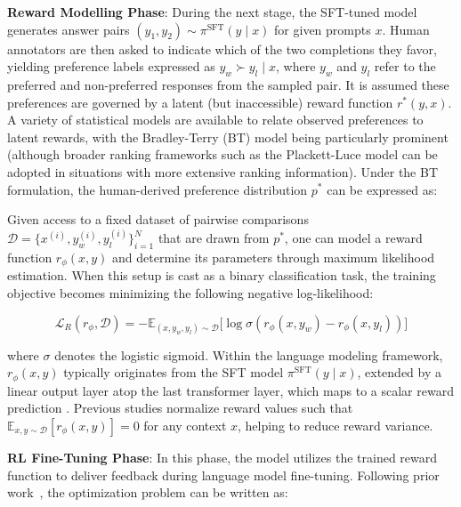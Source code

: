\textbf{Reward Modelling Phase}: During the next stage, the SFT-tuned model generates answer pairs $(y_1, y_2)\sim \pi^\text{SFT}(y \mid x)$ for given prompts $x$. Human annotators are then asked to indicate which of the two completions they favor, yielding preference labels expressed as $y_w\succ y_l \mid x$, where $y_w$ and $y_l$ refer to the preferred and non-preferred responses from the sampled pair. It is assumed these preferences are governed by a latent (but inaccessible) reward function $r^*(y, x)$. A variety of statistical models are available to relate observed preferences to latent rewards, with the Bradley-Terry (BT) model \cite{bradley1952rankanalysis} being particularly prominent (although broader ranking frameworks such as the Plackett-Luce model \citep{plackett1975analysis, luce2012individual} can be adopted in situations with more extensive ranking information). Under the BT formulation, the human-derived preference distribution $p^*$ can be expressed as:

Given access to a fixed dataset of pairwise comparisons $\mathcal{D} = \bigl\{x^{(i)}, y_w^{(i)}, y_l^{(i)}\bigr\}_{i=1}^N$ that are drawn from $p^*$, one can model a reward function $r_{\phi}(x, y)$ and determine its parameters through maximum likelihood estimation. When this setup is cast as a binary classification task, the training objective becomes minimizing the following negative log-likelihood:

\begin{equation}\label{eq:reward_model}
    \mathcal{L}_R(r_{\phi}, \mathcal{D}) = -\mathbb{E}_{(x, y_w, y_l)\sim \mathcal{D}}\bigl[\log \sigma(r_{\phi}(x, y_w)- r_{\phi}(x, y_l))\bigr]
\end{equation}

where $\sigma$ denotes the logistic sigmoid. Within the language modeling framework, $r_{\phi}(x, y)$ typically originates from the SFT model $\pi^\text{SFT}(y \mid x)$, extended by a linear output layer atop the last transformer layer, which maps to a scalar reward prediction \cite{ziegler2020finetuning}. Previous studies normalize reward values such that  $\mathbb{E}_{x,y\sim \mathcal{D}}\left[r_\phi(x, y)\right] = 0$ for any context $x$, helping to reduce reward variance.

\textbf{RL Fine-Tuning Phase}: In this phase, the model utilizes the trained reward function to deliver feedback during language model fine-tuning. Following prior work~\citep{jaques2017sequence, jaques2020human}, the optimization problem can be written as:

